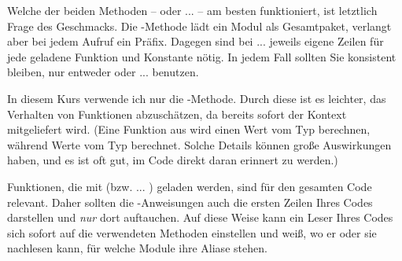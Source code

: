 \begin{hintbox}
Welche der beiden Methoden --  oder  ...  -- am besten funktioniert, ist letztlich Frage des Geschmacks. Die -Methode lädt ein Modul als Gesamtpaket, verlangt aber bei jedem Aufruf ein Präfix. Dagegen sind bei  ...  jeweils eigene Zeilen für jede geladene Funktion und Konstante nötig. In jedem Fall sollten Sie konsistent bleiben, \ie nur entweder  oder  ...  benutzen.

In diesem Kurs verwende ich nur die -Methode. Durch diese ist es leichter, das Verhalten von Funktionen abzuschätzen, da bereits sofort der Kontext mitgeliefert wird. (Eine Funktion aus  wird \idR einen Wert vom Typ  berechnen, während  \idR Werte vom Typ  berechnet. Solche Details können große Auswirkungen haben, und es ist oft gut, im Code direkt daran erinnert zu werden.)
\end{hintbox}

\begin{hintbox}
Funktionen, die mit  (bzw.  ... ) geladen werden, sind \idR für den gesamten Code relevant. Daher sollten die -Anweisungen auch die ersten Zeilen Ihres Codes darstellen und \emph{nur} dort auftauchen. Auf diese Weise kann ein Leser Ihres Codes sich sofort auf  die verwendeten Methoden einstellen und weiß, wo er oder sie nachlesen kann, für welche Module ihre Aliase stehen.
\end{hintbox}